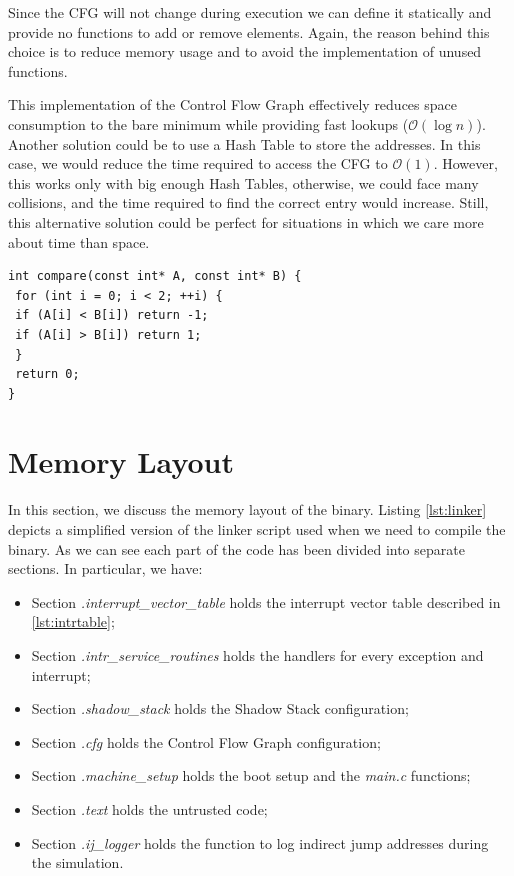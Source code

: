 Since the CFG will not change during execution we can define it statically and
provide no functions to add or remove elements. Again, the reason behind this
choice is to reduce memory usage and to avoid the implementation of unused
functions.

This implementation of the Control Flow Graph effectively reduces space
consumption to the bare minimum while providing fast lookups ($\mathcal{O}(\log{n}
)$). Another solution could be to use a Hash Table to store the addresses. In
this case, we would reduce the time required to access the CFG to $\mathcal{O}(1)$.
However, this works only with big enough Hash Tables, otherwise, we could face many
collisions, and the time required to find the correct entry would increase. Still,
this alternative solution could be perfect for situations in which we care more
about time than space.

\begin{lstlisting}[style=CStyle, caption= Comparison for binary search, label={lst:binsearch}]
int compare(const int* A, const int* B) {
 for (int i = 0; i < 2; ++i) {
 if (A[i] < B[i]) return -1;
 if (A[i] > B[i]) return 1;
 }
 return 0;
}
\end{lstlisting}

\section{Memory Layout}
\label{sec:layout}

In this section, we discuss the memory layout of the binary. Listing
\ref{lst:linker} depicts a simplified version of the linker script used when we
need to compile the binary. As we can see each part of the code has been divided
into separate sections. In particular, we have:
\begin{itemize}[noitemsep]
  \item Section \textit{.interrupt\_vector\_table} holds the interrupt vector
    table described in \ref{lst:intrtable};

  \item Section \textit{.intr\_service\_routines} holds the handlers for every
    exception and interrupt;

  \item Section \textit{.shadow\_stack} holds the Shadow Stack configuration;

  \item Section \textit{.cfg} holds the Control Flow Graph configuration;

  \item Section \textit{.machine\_setup} holds the boot setup and the \textit{main.c}
    functions;

  \item Section \textit{.text} holds the untrusted code;

  \item Section \textit{.ij\_logger} holds the function to log indirect jump
    addresses during the simulation.
\end{itemize}

